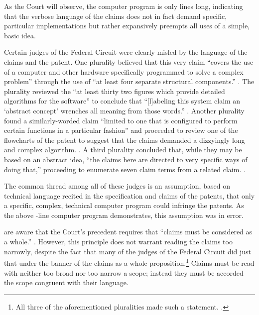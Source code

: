 \documentclass{scotus}
\begin{document}
As the Court will observe, the computer program is only \numlines lines long,
indicating that
the verbose language of the claims does not in fact demand specific, particular
implementations but rather expansively preempts all uses of a simple, basic
idea.

Certain judges of the Federal Circuit were clearly misled by the language of the
claims and the patent.
One plurality believed that this very claim ``covers the use of a computer and
other hardware specifically programmed to solve a complex problem'' through the
use of ``at least four separate structural components.'' . The plurality reviewed the ``at least thirty two figures
which
provide detailed algorithms for the software'' to conclude that ``[l]abeling
this system claim an `abstract concept' wrenches all meaning from those words.''
. Another plurality found a
similarly-worded claim ``limited to one that is configured to perform certain
functions in a particular fashion'' and proceeded to review one of the
flowcharts of the patent to suggest that the claims demanded a dizzyingly long
and complex algorithm. . A third plurality concluded that, while they may be based
on an abstract idea, ``the claims here are directed to very specific ways of
doing that,'' proceeding to enumerate seven claim terms from a related claim.
.

The common thread among all of these judges is an assumption, based on technical
language recited in the specification and claims of the patents, that only a
specific, complex, technical computer program could infringe the patents. As the
above \numlines-line computer program demonstrates, this assumption was in
error.

\Amici are aware that the Court's precedent requires that ``claims must be
considered as a whole.'' . However, this principle does
not warrant reading the claims too narrowly, despite the fact that many of the
judges of the Federal Circuit did just that under the banner of the
claims-as-a-whole proposition.\footnote{%
All three of the aforementioned pluralities made such a statement.
.} Claims must be read with neither too broad nor too narrow a
scope; instead they must be accorded the scope congruent with their language.
\end{document}
